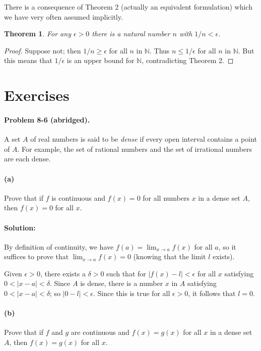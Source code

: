 \documentclass{article}
\newtheorem{theorem}{Theorem}
\begin{document}
There is a consequence of Theorem 2 (actually an equivalent formulation) which
we have very often assumed implicitly.

\begin{theorem}
  For any $\epsilon > 0$ there is a natural number $n$ with $1/n < \epsilon$.
\end{theorem}

\begin{proof}
  Suppose not; then $1/n \geq \epsilon$ for all $n$ in $\mathbb{N}$. Thus $n
  \leq 1/\epsilon$ for all $n$ in $\mathbb{N}$. But this means that
  $1/\epsilon$ is an upper bound for $\mathbb{N}$, contradicting Theorem 2.
\end{proof}

\section*{Exercises}

\paragraph{Problem 8-6 (abridged).} A set $A$ of real numbers is said to be
\emph{dense} if every open interval contains a point of $A$. For example, the
set of rational numbers and the set of irrational numbers are each dense.

\paragraph{(a)} Prove that if $f$ is continuous and $f(x) = 0$ for all numbers
$x$ in a dense set $A$, then $f(x) = 0$ for all $x$.

\paragraph{Solution:} By definition of continuity, we have $f(a) = \lim_{x
\rightarrow a}f(x)$ for all $a$, so it suffices to prove that $\lim_{x
\rightarrow a}f(x) = 0$ (knowing that the limit $l$ exists).

Given $\epsilon > 0$, there exists a $\delta > 0$ such that for $|f(x) - l| <
\epsilon$ for all $x$ satisfying $0 < |x - a| < \delta$. Since $A$ is dense,
there is a number $x$ in $A$ satisfying $0 < |x - a| < \delta$; so $|0 - l| <
\epsilon$. Since this is true for all $\epsilon > 0$, it follows that $l = 0$.

\paragraph{(b)} Prove that if $f$ and $g$ are continuous and $f(x) = g(x)$ for
all $x$ in a dense set $A$, then $f(x) = g(x)$ for all $x$.
\end{document}
